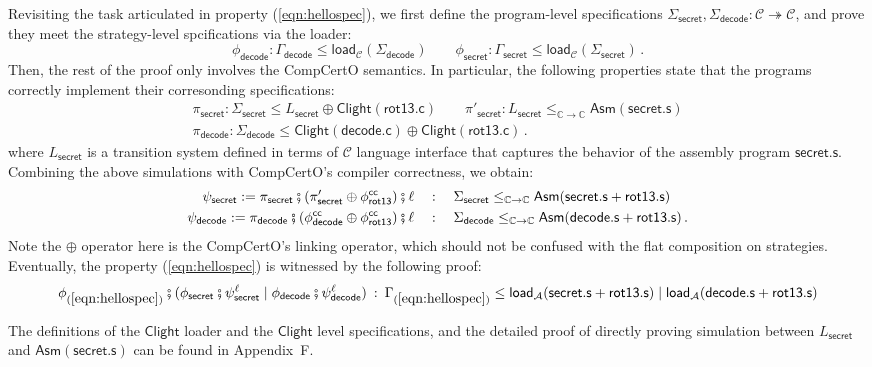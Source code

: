 \documentclass[acmsmall,screen,review,anonymous,nonacm]{acmart}
\newcommand{\kw}[1]{\ensuremath{ \mathsf{#1} }}
\begin{document}
\begin{example}
Revisiting
the task articulated in property (\ref{eqn:hellospec}),
we first
define the
program-level specifications
$\Sigma_\kw{secret}, \Sigma_\kw{decode} :
\mathcal{C} \twoheadrightarrow \mathcal{C}$,
and prove
they meet
the strategy-level spcifications
via the loader:
\[
  \phi_\kw{decode}: \Gamma_\kw{decode} \le \kw{load}_\mathcal{C}(\Sigma_\kw{decode})
  \qquad
  \phi_\kw{secret}: \Gamma_\kw{secret} \le \kw{load}_\mathcal{C}(\Sigma_\kw{secret})
  \,.
\]%
Then, the rest of the proof
only involves the CompCertO semantics.
In particular,
the following properties
state that
the programs correctly implement
their corresonding specifications:
\begin{gather*}
  \pi_\kw{secret}: \Sigma_\kw{secret} \le L_\kw{secret} \oplus \kw{Clight}(\kw{rot13.c})
  \qquad
  \pi'_\kw{secret}: L_\kw{secret} \le_{\mathbb{C} \rightarrow \mathbb{C}} \kw{Asm}(\kw{secret.s})
  \\
  \pi_\kw{decode}: \Sigma_\kw{decode} \le \kw{Clight}(\kw{decode.c}) \oplus \kw{Clight}(\kw{rot13.c})
  \,.
\end{gather*}
where $L_\kw{secret}$
is a transition system
defined in terms of $\mathcal{C}$ language interface
that captures the behavior of
the assembly program $\kw{secret.s}$.
Combining the above simulations
with CompCertO's compiler correctness,
we obtain:
\begin{align*}
   \psi_\kw{secret} := \pi_\kw{secret} \fatsemi
  (\pi'_\kw{secret} \oplus \phi^\kw{cc}_\kw{rot13})
  \fatsemi \ell
  & \quad :\quad \Sigma_\kw{secret} \le_{\mathbb{C} \rightarrow \mathbb{C}}
  \kw{Asm}(\kw{secret.s} + \kw{rot13.s}) \\
   \psi_\kw{decode} := \pi_\kw{decode} \fatsemi
  (\phi^\kw{cc}_\kw{decode} \oplus \phi^\kw{cc}_\kw{rot13})
  \fatsemi \ell
  & \quad :\quad \Sigma_\kw{decode} \le_{\mathbb{C} \rightarrow \mathbb{C}}
  \kw{Asm}(\kw{decode.s} + \kw{rot13.s})
  \,.
\end{align*}
Note the $\oplus$ operator here
is the CompCertO's linking operator,
which should not be confused
with the flat composition
on strategies.
Eventually,
the property (\ref{eqn:hellospec})
is witnessed by the following proof:
\[
 \phi_\kw{(\ref{eqn:hellospec})} \fatsemi
 (\phi_\kw{secret} \fatsemi \psi_\kw{secret}^\ell \mid
 \phi_\kw{decode} \fatsemi \psi_\kw{decode}^\ell) \: : \:
 \Gamma_\kw{(\ref{eqn:hellospec})} \le \kw{load}_\mathcal{A}(\kw{secret.s} + \kw{rot13.s})
 \mid \kw{load}_\mathcal{A}(\kw{decode.s} + \kw{rot13.s})
\]
\end{example}%
The definitions of
the $\kw{Clight}$ loader and
the $\kw{Clight}$ level specifications,
and the detailed proof
of directly proving simulation
between $L_\kw{secret}$ and $\kw{Asm}(\kw{secret.s})$
can be found in Appendix~F.
\end{document}
